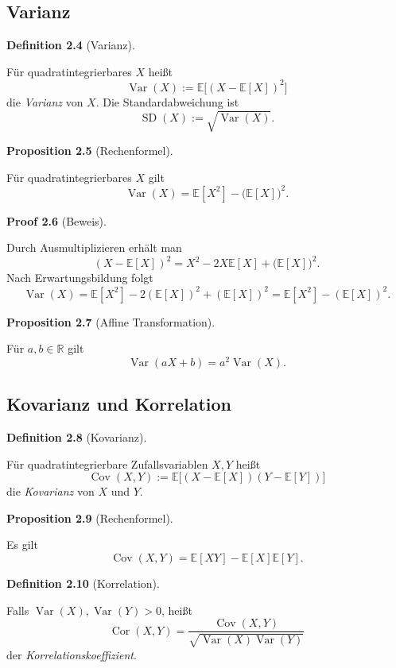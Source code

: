\documentclass[10pt, letterpaper]{article}
\newcommand{\R}{\mathbb{R}}
\newcommand{\CustomHeading}[3]{%
  \par\medskip\noindent%
  \textbf{#1 #2} \textnormal{(#3)}.\enskip%
}
\newenvironment{DEF}[2]{\CustomHeading{Definition}{#1}{#2}}{}
\newenvironment{PROP}[2]{\CustomHeading{Proposition}{#1}{#2}}{}
\newenvironment{PROOF}[2]{\CustomHeading{Proof}{#1}{#2}}{}
\begin{document}
\subsection{Varianz}

\begin{DEF}{2.4}{Varianz}
Für quadratintegrierbares \(X\) heißt
\[
\operatorname{Var}(X):=\mathbb E\bigl[(X-\mathbb E[X])^2\bigr]
\]
die \emph{Varianz} von \(X\). Die Standardabweichung ist
\[
\operatorname{SD}(X):=\sqrt{\operatorname{Var}(X)}.
\]
\end{DEF}

\begin{PROP}{2.5}{Rechenformel}
Für quadratintegrierbares \(X\) gilt
\[
\operatorname{Var}(X)=\mathbb E[X^2]-\bigl(\mathbb E[X]\bigr)^2.
\]
\end{PROP}

\begin{PROOF}{2.6}{Beweis}
Durch Ausmultiplizieren erhält man
\[
(X-\mathbb E[X])^2=X^2-2X\mathbb E[X]+\bigl(\mathbb E[X]\bigr)^2.
\]
Nach Erwartungsbildung folgt
\[
\operatorname{Var}(X)
=
\mathbb E[X^2]-2(\mathbb E[X])^2+(\mathbb E[X])^2
=
\mathbb E[X^2]-(\mathbb E[X])^2.
\]
\end{PROOF}

\begin{PROP}{2.7}{Affine Transformation}
Für \(a,b\in\R\) gilt
\[
\operatorname{Var}(aX+b)=a^2\operatorname{Var}(X).
\]
\end{PROP}

\subsection{Kovarianz und Korrelation}

\begin{DEF}{2.8}{Kovarianz}
Für quadratintegrierbare Zufallsvariablen \(X,Y\) heißt
\[
\operatorname{Cov}(X,Y)
:=
\mathbb E\bigl[(X-\mathbb E[X])(Y-\mathbb E[Y])\bigr]
\]
die \emph{Kovarianz} von \(X\) und \(Y\).
\end{DEF}

\begin{PROP}{2.9}{Rechenformel}
Es gilt
\[
\operatorname{Cov}(X,Y)=\mathbb E[XY]-\mathbb E[X]\mathbb E[Y].
\]
\end{PROP}

\begin{DEF}{2.10}{Korrelation}
Falls \(\operatorname{Var}(X),\operatorname{Var}(Y)>0\), heißt
\[
\operatorname{Cor}(X,Y)
=
\frac{\operatorname{Cov}(X,Y)}{\sqrt{\operatorname{Var}(X)\operatorname{Var}(Y)}}
\]
der \emph{Korrelationskoeffizient}.
\end{DEF}
\end{document}
